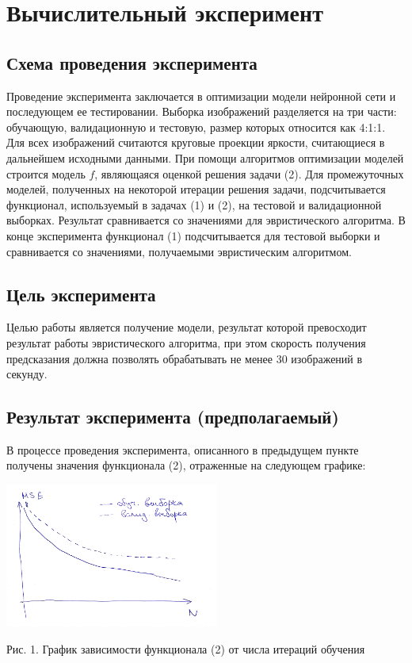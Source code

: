 \documentclass[12pt, twoside]{article}
\begin{document}
\section{Вычислительный эксперимент}

\subsection{Схема проведения эксперимента}

Проведение эксперимента заключается в оптимизации модели нейронной сети и последующем ее тестировании. Выборка изображений разделяется на три части: обучающую, валидационную и тестовую, размер которых относится как 4:1:1. Для всех изображений считаются круговые проекции яркости, считающиеся в дальнейшем исходными данными. При помощи алгоритмов оптимизации моделей строится модель $f$, являющаяся оценкой решения задачи (2).  Для промежуточных моделей, полученных на некоторой итерации решения задачи, подсчитывается функционал, используемый в задачах (1) и (2), на тестовой и валидационной выборках. Результат сравнивается со значениями для эвристического алгоритма. В конце эксперимента функционал (1) подсчитывается для тестовой выборки и сравнивается со значениями, получаемыми эвристическим алгоритмом.

\subsection{Цель эксперимента}

Целью работы является получение модели, результат которой превосходит результат работы эвристического алгоритма, при этом скорость получения предсказания должна позволять обрабатывать не менее 30 изображений в секунду.

\subsection{Результат эксперимента (предполагаемый)}

В процессе проведения эксперимента, описанного в предыдущем пункте получены значения функционала (2), отраженные на следующем графике:

\begin{center}
\includegraphics[width=7cm]{img/graph1.pdf}

Рис. 1. График зависимости функционала (2) от числа итераций обучения
\end{center}
\end{document}
